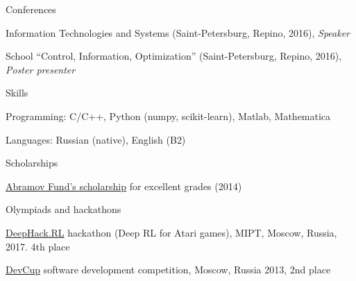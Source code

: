 \documentclass{resume} %
\begin{document}
\begin{rSection}{Conferences}
\item Information Technologies and Systems (Saint-Petersburg, Repino, 2016){, \em Speaker}
\item School ``Control, Information, Optimization'' (Saint-Petersburg, Repino, 2016){, \em Poster presenter}
\end{rSection}

\begin{rSection}{Skills}
	\item Programming: C/C++, Python (numpy, scikit-learn), Matlab, Mathematica
	\item Languages: Russian (native), English (B2)
\end{rSection}

\begin{rSection}{Scholarships}
\item \href{http://phystech-foundation.org/}{Abramov Fund's scholarship} for excellent grades (2014)
\end{rSection}


\begin{rSection}{Olympiads and hackathons}
\item \href{http://rl.deephack.me/}{DeepHack.RL} hackathon (Deep RL for Atari games), MIPT, Moscow, Russia, 2017. 4th place
\item \href{https://vk.com/devcup}{DevCup} software development competition, Moscow, Russia 2013, 2nd place
\end{rSection}
\end{document}
